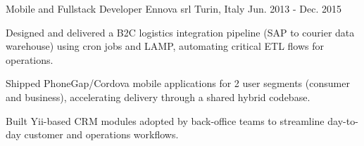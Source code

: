 \begin{cventries}

\vspace{5mm}

\cventry
{Mobile and Fullstack Developer} %
{Ennova srl} %
{Turin, Italy} %
{Jun. 2013 - Dec. 2015} %
{ %
	\begin{cvitems}
		\item {Designed and delivered a B2C logistics integration pipeline (SAP to courier data warehouse) using cron jobs and LAMP, automating critical ETL flows for operations.}
		\item {Shipped PhoneGap/Cordova mobile applications for 2 user segments (consumer and business), accelerating delivery through a shared hybrid codebase.}
		\item {Built Yii-based CRM modules adopted by back-office teams to streamline day-to-day customer and operations workflows.}
	\end{cvitems}
}

\end{cventries}